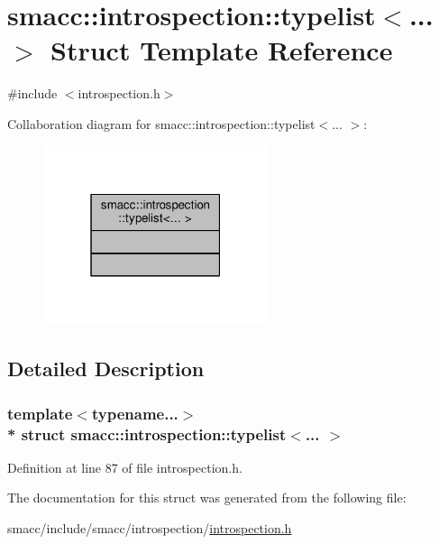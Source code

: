 \hypertarget{structsmacc_1_1introspection_1_1typelist}{}\section{smacc\+:\+:introspection\+:\+:typelist$<$... $>$ Struct Template Reference}
\label{structsmacc_1_1introspection_1_1typelist}


{\ttfamily \#include $<$introspection.\+h$>$}



Collaboration diagram for smacc\+:\+:introspection\+:\+:typelist$<$... $>$\+:\nopagebreak
\begin{figure}[H]
\begin{center}
\leavevmode
\includegraphics[width=187pt]{structsmacc_1_1introspection_1_1typelist__coll__graph}
\end{center}
\end{figure}


\subsection{Detailed Description}
\subsubsection*{template$<$typename...$>$\\*
struct smacc\+::introspection\+::typelist$<$... $>$}



Definition at line 87 of file introspection.\+h.



The documentation for this struct was generated from the following file\+:\begin{DoxyCompactItemize}
\item 
smacc/include/smacc/introspection/\hyperlink{introspection_8h}{introspection.\+h}\end{DoxyCompactItemize}
